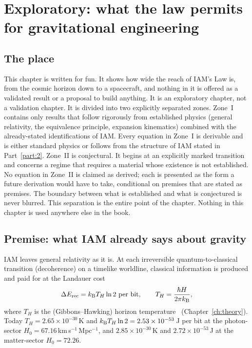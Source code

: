 \chapter{Exploratory: what the law permits for gravitational engineering}\label{ch:exploratory}

\section*{The place}
This chapter is written for fun. It shows how wide the reach of IAM's Law is, from the cosmic horizon down to a spacecraft, and
nothing in it is offered as a validated result or a proposal to build anything. It is an exploratory chapter, not a validation chapter. It is divided into two explicitly separated zones. Zone~I contains only results that follow
rigorously from established physics (general relativity, the equivalence principle, expansion kinematics) combined with the already-stated
identifications of IAM. Every equation in Zone~I is derivable and is either standard physics or follows from the structure of IAM stated in
Part~\ref{part:2}. Zone~II is conjectural. It begins at an explicitly marked transition and concerns a regime that requires a material whose existence
is not established. No equation in Zone~II is claimed as derived; each is presented as the form a future derivation would have to take, conditional on
premises that are stated as premises. The boundary between what is established and what is conjectured is never blurred. This separation is the
entire point of the chapter. Nothing in this chapter is used anywhere else in the book.

\section{Premise: what IAM already says about gravity}\label{sec:ge_premise}
IAM leaves general relativity as it is. At each irreversible quantum-to-classical transition (decoherence) on a timelike worldline, classical
information is produced and paid for at the Landauer cost~\cite{Landauer1961}
\begin{equation}
\Delta E_{\rm rec}=k_{\mathrm B} T_H\ln2\ \text{per bit},\qquad T_H=\frac{\hbar H}{2\pi k_{\mathrm B}},
\label{eq:ge_landauer}
\end{equation}
where $T_H$ is the (Gibbons--Hawking) horizon temperature~\cite{GibbonsHawking1977} (Chapter~\ref{ch:theory}). Today $T_H=2.65\times10^{-30}$\,K and
$k_{\mathrm B} T_H\ln2=2.53\times10^{-53}$\,J per bit at the photon-sector $H_0=67.16$\,km\,s$^{-1}$\,Mpc$^{-1}$, and $2.85\times10^{-30}$\,K and
$2.72\times10^{-53}$\,J at the matter-sector $H_0=72.26$. \calc

